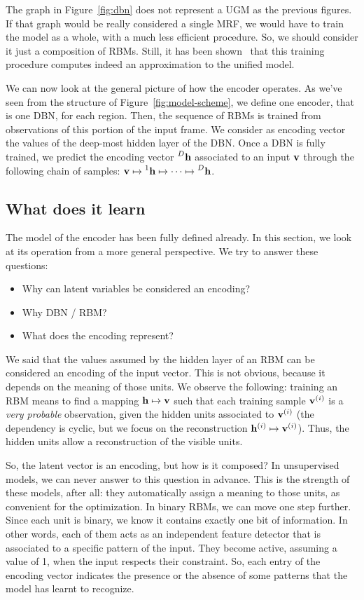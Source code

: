 The graph in Figure~\ref{fig:dbn} does not represent a UGM as the previous
figures. If that graph would be really considered a single MRF, we would have
to train the model as a whole, with a much less efficient procedure. So, we
should consider it just a composition of RBMs. Still, it has been
shown~\cite{bib:dbn-learning} that this training procedure computes indeed
an approximation to the unified model.

We can now look at the general picture of how the encoder operates. As we've
seen from the structure of Figure~\vref{fig:model-scheme}, we define one
encoder, that is one DBN, for each region. Then, the sequence of RBMs is
trained from observations of this portion of the input frame. We consider as
encoding vector the values of the deep-most hidden layer of the DBN. Once a
DBN is fully trained, we predict the encoding vector $\prescript{D}{}{\mathbf{h}}$
associated to an input $\mathbf{v}$ through the following chain of samples: $\mathbf{v}
\mapsto \prescript{1}{}{\mathbf{h}} \mapsto \dots \mapsto \prescript{D}{}{\mathbf{h}}$.


\subsection{What does it learn}

\label{sec:encoding-what-learns}

The model of the encoder has been fully defined already. In this section, we
look at its operation from a more general perspective. We try to answer these
questions:
\begin{itemize}[nosep]
	\item Why can latent variables be considered an encoding?
	\item Why DBN / RBM?
	\item What does the encoding represent?
\end{itemize}
\bigskip

We said that the values assumed by the hidden layer of an RBM can be
considered an encoding of the input vector. This is not obvious, because it
depends on the meaning of those units. We observe the following: training an
RBM means to find a mapping $\mathbf{h} \mapsto \mathbf{v}$ such that each training sample
$\mathbf{v}^{(i)}$ is a \emph{very probable} observation, given the hidden units
associated to $\mathbf{v}^{(i)}$ (the dependency is cyclic, but we focus on the
reconstruction $\mathbf{h}^{(i)} \mapsto \mathbf{v}^{(i)}$). Thus, the hidden units
allow a reconstruction of the visible units.

So, the latent vector is an encoding, but how is it composed? In unsupervised
models, we can never answer to this question in advance. This is the strength
of these models, after all: they automatically assign a meaning to those
units, as convenient for the optimization. In binary RBMs, we can move one
step further. Since each unit is binary, we know it contains exactly one bit
of information. In other words, each of them acts as an independent feature
detector that is associated to a specific pattern of the input. They become
active, assuming a value of 1, when the input respects their constraint. So,
each entry of the encoding vector indicates the presence or the absence of
some patterns that the model has learnt to recognize.

